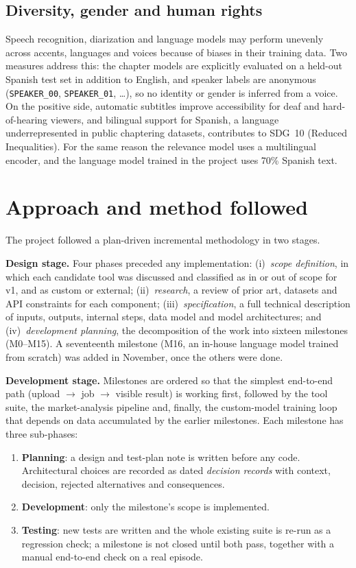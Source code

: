 \documentclass[ENG]{TFUOC}
\begin{document}
\subsection*{Diversity, gender and human rights}

Speech recognition, diarization and language models may perform unevenly across accents, languages and voices because of biases in their training data. Two measures address this: the chapter models are explicitly evaluated on a held-out Spanish test set in addition to English, and speaker labels are anonymous (\texttt{SPEAKER\_00}, \texttt{SPEAKER\_01}, \dots), so no identity or gender is inferred from a voice. On the positive side, automatic subtitles improve accessibility for deaf and hard-of-hearing viewers, and bilingual support for Spanish, a language underrepresented in public chaptering datasets, contributes to SDG~10 (Reduced Inequalities). For the same reason the relevance model uses a multilingual encoder, and the language model trained in the project uses 70\% Spanish text.

\section{Approach and method followed}

The project followed a plan-driven incremental methodology in two stages.

\textbf{Design stage.} Four phases preceded any implementation: (i)~\textit{scope definition}, in which each candidate tool was discussed and classified as in or out of scope for v1, and as custom or external; (ii)~\textit{research}, a review of prior art, datasets and API constraints for each component; (iii)~\textit{specification}, a full technical description of inputs, outputs, internal steps, data model and model architectures; and (iv)~\textit{development planning}, the decomposition of the work into sixteen milestones (M0--M15). A seventeenth milestone (M16, an in-house language model trained from scratch) was added in November, once the others were done.

\textbf{Development stage.} Milestones are ordered so that the simplest end-to-end path (upload $\rightarrow$ job $\rightarrow$ visible result) is working first, followed by the tool suite, the market-analysis pipeline and, finally, the custom-model training loop that depends on data accumulated by the earlier milestones. Each milestone has three sub-phases:
\begin{enumerate}
\item \textbf{Planning}: a design and test-plan note is written before any code. Architectural choices are recorded as dated \textit{decision records} with context, decision, rejected alternatives and consequences.
\item \textbf{Development}: only the milestone's scope is implemented.
\item \textbf{Testing}: new tests are written and the whole existing suite is re-run as a regression check; a milestone is not closed until both pass, together with a manual end-to-end check on a real episode.
\end{enumerate}
\end{document}
